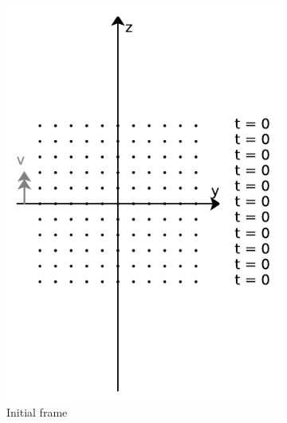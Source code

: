 \begin{figure}[H]
	\centering
	\begin{subfigure}{0.29\textwidth}
		\centering
		\includegraphics[width=\textwidth]{images/pdf/coord_transform_initial.pdf}
		\caption{Initial frame}
		\label{fig: coordinate transform subfig_1}
	\end{subfigure}
	\begin{subfigure}{0.32\textwidth}
		\centering

\end{subfigure}
\end{figure}
